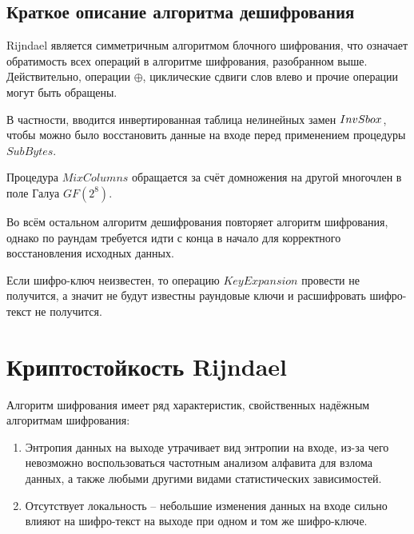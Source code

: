 \subsection{Краткое описание алгоритма дешифрования}

    Rijndael является симметричным алгоритмом блочного шифрования, что означает обратимость всех операций
    в алгоритме шифрования, разобранном выше. Действительно, операции $\oplus$, циклические сдвиги слов влево
    и прочие операции могут быть обращены.

    В частности, вводится инвертированная таблица нелинейных замен $Inv\-S\-box$,
    чтобы можно было восстановить данные на входе перед применением процедуры $SubBytes$.

    Процедура $MixColumns$ обращается за счёт домножения на другой многочлен в поле Галуа $GF(2^8)$.

    Во всём остальном алгоритм дешифрования повторяет алгоритм шифрования, однако по раундам требуется идти
    с конца в начало для корректного восстановления исходных данных.

    Если шифро-ключ неизвестен, то операцию $KeyExpansion$ провести не получится, а значит не будут известны
    раундовые ключи и расшифровать шифро-текст не получится.

\section{Криптостойкость Rijndael}

    Алгоритм шифрования имеет ряд характеристик, свойственных надёжным алгоритмам шифрования:
    \begin{enumerate}
        \item Энтропия данных на выходе утрачивает вид энтропии на входе, из-за чего невозможно воспользоваться
        частотным анализом алфавита для взлома данных, а также любыми другими видами статистических зависимостей.
        \item Отсутствует локальность -- небольшие изменения данных на входе сильно влияют на шифро-текст на выходе
        при одном и том же шифро-ключе.
    \end{enumerate}

